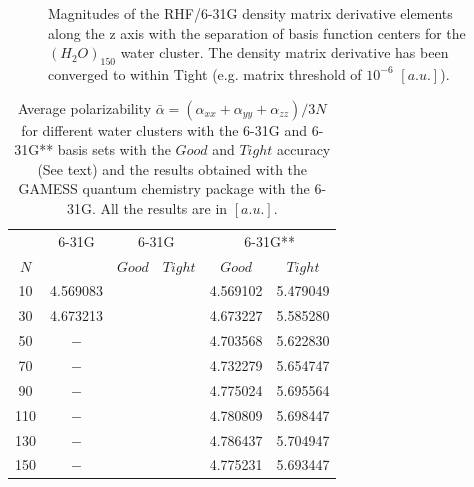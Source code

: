 \documentclass[twocolumn,showpacs,preprintnumbers,amsmath,amssymb]{revtex4}
\begin{document}
\begin{figure}
  \centering
  \caption{\protect
    Magnitudes of the RHF/6-31G density matrix derivative elements 
    along the z axis with the separation of basis function centers
    for the $(H_2O)_{150}$ water cluster. The density matrix 
    derivative has been converged to within Tight (e.g. 
    matrix threshold of $10^{-6}$ $[a.u.]$).
  }\label{fig:DPrimeZ_150_6-31G}
  \begin{center}
  \end{center}
\end{figure}
\begin{table}
  \centering
  \caption{\protect
    Average polarizability $\bar{\alpha}=(\alpha_{xx}+\alpha_{yy}+\alpha_{zz})/3N$
    for different water clusters with the 6-31G and 6-31G** basis sets
    with the $Good$ and $Tight$ accuracy (See text) and the results obtained with
    the GAMESS quantum chemistry package \cite{gamess} with the 6-31G. 
    All the results are in $[a.u.]$.
  }\label{tab:Polari_Values}
  \begin{ruledtabular}
    \begin{tabular}{cccccc}
      &\multicolumn{1}{c}{6-31G\footnotemark[1]}
      &\multicolumn{2}{c}{6-31G\footnotemark[2]}
      &\multicolumn{2}{c}{6-31G**\footnotemark[2]}\\
      $N$ & & $Good$ & $Tight$
          & $Good$ & $Tight$\\
      \hline
      10  & 4.569083 &  &  & 4.569102 & 5.479049  \\
      30  & 4.673213 &  &  & 4.673227 & 5.585280  \\
      50  & $-$      &  &  & 4.703568 & 5.622830  \\
      70  & $-$      &  &  & 4.732279 & 5.654747  \\
      90  & $-$      &  &  & 4.775024 & 5.695564  \\
      110 & $-$      &  &  & 4.780809 & 5.698447  \\
      130 & $-$      &  &  & 4.786437 & 5.704947  \\
      150 & $-$      &  &  & 4.775231 & 5.693447  \\
    \end{tabular}
  \end{ruledtabular}
\end{table}
\end{document}
